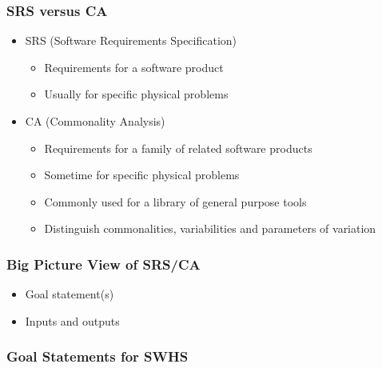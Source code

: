 \documentclass[t,12pt,numbers,fleqn]{beamer}
\begin{document}

\begin{frame}
\frametitle{SRS versus CA}

\begin{itemize}
\item SRS (Software Requirements Specification)
\begin{itemize}
\item Requirements for a software product
\item Usually for specific physical problems
\end{itemize}
\item CA (Commonality Analysis)
\begin{itemize}
\item Requirements for a family of related software products
\item Sometime for specific physical problems
\item Commonly used for a library of general purpose tools
\item Distinguish commonalities, variabilities and parameters of variation
\end{itemize}

\end{itemize}

\end{frame}


\begin{frame}
\frametitle{Big Picture View of SRS/CA}

\begin{itemize}
\item Goal statement(s)
\item Inputs and outputs
\end{itemize}

\end{frame}


\begin{frame}
\frametitle{Goal Statements for SWHS}


\end{frame}

\end{document}
